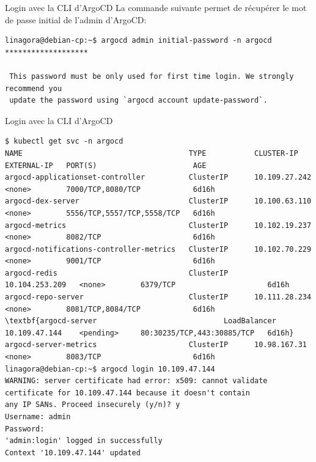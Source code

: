 
\begin{frame}[fragile]{Login avec la CLI d'ArgoCD}
La commande suivante permet de récupérer le mot de passe initial de l'admin d'ArgoCD:

\begin{tiny}
\begin{Verbatim}[commandchars=\\\#\#]
linagora@debian-cp:~$ argocd admin initial-password -n argocd
*******************

 This password must be only used for first time login. We strongly recommend you 
 update the password using `argocd account update-password`.
\end{Verbatim}
\end{tiny}

\end{frame}


\begin{frame}[shrink=4,fragile]{Login avec la CLI d'ArgoCD}

\begin{tiny}
\begin{Verbatim}[commandchars=\\\{\}]
$ kubectl get svc -n argocd
NAME                                      TYPE           CLUSTER-IP       EXTERNAL-IP   PORT(S)                      AGE
argocd-applicationset-controller          ClusterIP      10.109.27.242    <none>        7000/TCP,8080/TCP            6d16h
argocd-dex-server                         ClusterIP      10.100.63.110    <none>        5556/TCP,5557/TCP,5558/TCP   6d16h
argocd-metrics                            ClusterIP      10.102.19.237    <none>        8082/TCP                     6d16h
argocd-notifications-controller-metrics   ClusterIP      10.102.70.229    <none>        9001/TCP                     6d16h
argocd-redis                              ClusterIP      10.104.253.209   <none>        6379/TCP                     6d16h
argocd-repo-server                        ClusterIP      10.111.28.234    <none>        8081/TCP,8084/TCP            6d16h
\textbf{argocd-server                             LoadBalancer   10.109.47.144    <pending>     80:30235/TCP,443:30885/TCP   6d16h}
argocd-server-metrics                     ClusterIP      10.98.167.31     <none>        8083/TCP                     6d16h
linagora@debian-cp:~$ argocd login 10.109.47.144
WARNING: server certificate had error: x509: cannot validate certificate for 10.109.47.144 because it doesn't contain 
any IP SANs. Proceed insecurely (y/n)? y
Username: admin
Password: 
'admin:login' logged in successfully
Context '10.109.47.144' updated

\end{Verbatim}
\end{tiny}

\end{frame}

